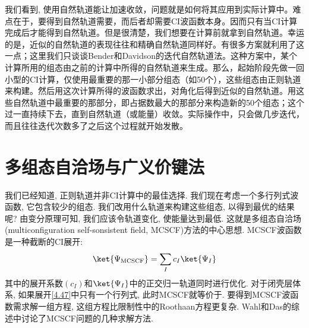我们看到, 使用自然轨道能让加速收敛，问题就是如何将其应用到实际计算中。难点在于，要得到自然轨道需要，而后者却需要CI波函数本身。因而只有当CI计算完成后才能得到自然轨道。但是很清楚，我们想要在计算前就拿到自然轨道。幸运的是，近似的自然轨道的表现往往和精确自然轨道同样好。有很多方案就利用了这一点；这里我们只谈谈Bender和Davidson的迭代自然轨道法。这种方案中，某个计算所用的组态由之前的计算中所得的自然轨道来生成。那么，起始阶段先做一回小型的CI计算，仅使用最重要的那一小部分组态（如50个），这些组态由正则\hft 轨道来构建。然后用这次计算所得的波函数求出，对角化后得到近似的自然轨道。用这些自然轨道中最重要的那部分，即占据数最大的那部分来构造新的50个组态；这个过一直持续下去，直到自然轨道（或能量）收敛。实际操作中，只会做几步迭代，而且往往迭代次数多了之后这个过程就开始发散。

\section{多组态自洽场与广义价键法}
\label{sec4.5}
我们已经知道, 
正则\hft 轨道并非CI计算中的最佳选择. 
我们现在考虑一个多行列式波函数, 
它包含较少的组态. 
我们改用什么轨道来构建这些组态, 
以得到最优的结果呢? 由变分原理可知, 
我们应该令轨道变化, 
使能量达到最低. 
这就是多组态自洽场(multiconfiguration self-sonsistent field, 
MCSCF)方法的中心思想. 
MCSCF波函数是一种截断的CI展开:
\begin{align}
\ket{\Psi_\mathrm{MCSCF}} = \sum_I c_I\ket{\Psi_I}
\label{4.47}
\end{align}
其中的展开系数$(c_I)$和$\ket{\Psi_I}$中的正交归一轨道同时进行优化. 对于闭壳层体系, 如果展开\autoref{4.47}中只有一个行列式, 此时MCSCF就等价于\hft. 要得到MCSCF波函数需求解一组方程, 这组方程比限制性\hft 中的Roothaan方程更复杂. Wahl和Das的综述中讨论了MCSCF问题的几种求解方法.

